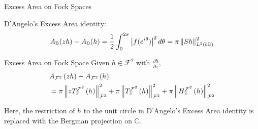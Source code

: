 \documentclass{reu_beamer}
\begin{document}
\begin{frame}{Excess Area on Fock Spaces}
    \begin{center}
        \small
        D'Angelo's Excess Area identity: 
        \[A_{\mathbb{D}}(zh) - A_{\mathbb{D}}(h) = \frac{1}{2}\int_0^{2\pi}\left|f(e^{i\theta})\right|^2d\theta = \pi \left\Vert Sh \right\Vert_{L^{2}(b\mathbb{D})}^2\]
    \end{center}
    \begin{block}{Excess Area on Fock Space}
    Given $h\in \mathcal{F}^2 $ with $\frac{\partial h}{\partial z}$,
    \begin{align*}
        &A_{\mathcal{F}^2}\left(zh\right) - A_{\mathcal{F}^2}\left(h\right) \\
        &= \pi \left\Vert zT^{\mathcal{F}^2}_{\overline{z}}\left(h\right) \right\Vert_{\mathcal{F}^2}^2+\pi\left\Vert T^{\mathcal{F}^2}_{\overline{z}}\left(h\right) \right\Vert_{\mathcal{F}^2}^2+ \pi\left\Vert H^{\mathcal{F}^2}_{\overline{z}}\left(h\right) \right\Vert_{\mathcal{F}^2}^2
    \end{align*}
    \end{block}  
    Here, the restriction of \(h\) to the unit circle in D'Angelo's Excess Area identity is replaced with the Bergman projection on $\mathbb{C}$.\\
\end{frame}
\end{document}
